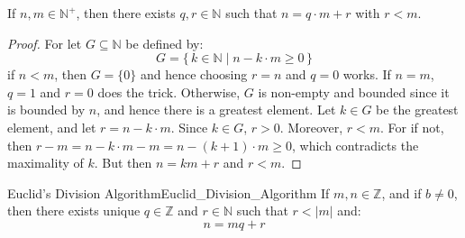 \documentclass{article}                                                        %
\begin{document}
            \begin{theorem}
                \label{thm:Weak_Euc_Division_Alg}%
                If $n,m\in\mathbb{N}^{+}$, then there exists $q,r\in\mathbb{N}$
                such that $n=q\cdot{m}+r$ with $r<m$.
            \end{theorem}
            \begin{proof}
                For let $G\subseteq\mathbb{N}$ be defined by:
                \begin{equation}
                    G=\{\,k\in\mathbb{N}\;|\;n-k\cdot{m}\geq{0}\,\}
                \end{equation}
                if $n<m$, then $G=\{0\}$ and hence choosing $r=n$ and $q=0$
                works. If $n=m$, $q=1$ and $r=0$ does the trick. Otherwise, $G$
                is non-empty and bounded since it is bounded by $n$, and hence
                there is a greatest element. Let $k\in{G}$ be the greatest
                element, and let $r=n-k\cdot{m}$. Since $k\in{G}$, $r>0$.
                Moreover, $r<m$. For if not, then
                $r-m=n-k\cdot{m}-m=n-(k+1)\cdot{m}\geq{0}$, which contradicts
                the maximality of $k$. But then $n=km+r$ and $r<m$.
            \end{proof}
            \begin{ftheorem}{Euclid's Division Algorithm}{Euclid_Division_Algorithm}
                If $m,n\in\mathbb{Z}$, and if $b\ne{0}$, then there exists unique
                $q\in\mathbb{Z}$ and $r\in\mathbb{N}$ such that $r<|m|$ and:
                \begin{equation*}
                    n=mq+r
                \end{equation*}
            \end{ftheorem}
\end{document}
